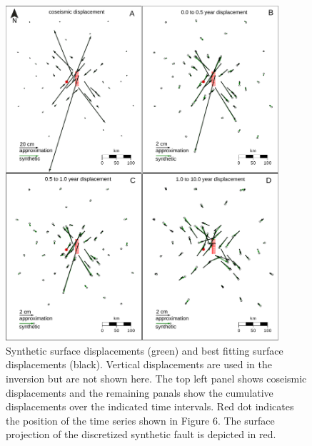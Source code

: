 \documentclass[extra]{gji}
\begin{document}
\begin{figure}[h!]\label{figure5}
  \centering
  \includegraphics[width=0.9\textwidth]{FinalFigures/Figure4.pdf}
  \caption{Synthetic surface displacements (green) and best fitting
    surface displacements (black).  Vertical displacements are used in
    the inversion but are not shown here.  The top left panel shows
    coseismic displacements and the remaining panals show the
    cumulative displacements over the indicated time intervals. Red dot indicates
    the position of the time series shown in Figure 6. The surface
    projection of the discretized synthetic fault is depicted in red.}
  \label{Figure 5}
\end{figure}
\end{document}
